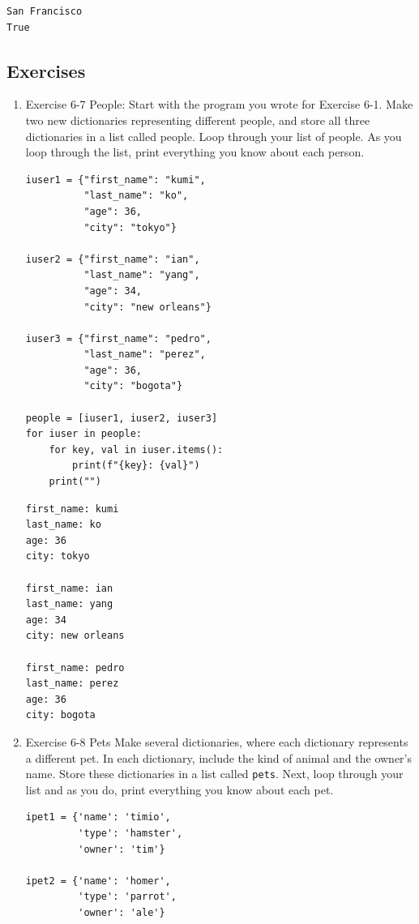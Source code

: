 \documentclass[10pt]{book}
\begin{document}
\label{org8144d53}
\begin{verbatim}
San Francisco
True
\end{verbatim}
\subsection{Exercises}
\label{sec:org0406610}
\begin{enumerate}
\item Exercise 6-7 People:
\label{sec:orgbe842dd}
Start with the program you wrote for Exercise 6-1. Make two new dictionaries representing different people, and store all three dictionaries in a list called people. Loop through your list of people. As you loop through the list, print everything you know about each person.
\begin{verbatim}
iuser1 = {"first_name": "kumi",
          "last_name": "ko",
          "age": 36,
          "city": "tokyo"}

iuser2 = {"first_name": "ian",
          "last_name": "yang",
          "age": 34,
          "city": "new orleans"}

iuser3 = {"first_name": "pedro",
          "last_name": "perez",
          "age": 36,
          "city": "bogota"}

people = [iuser1, iuser2, iuser3]
for iuser in people:
    for key, val in iuser.items():
        print(f"{key}: {val}")
    print("")
\end{verbatim}

\label{org0f644f3}
\begin{verbatim}
first_name: kumi
last_name: ko
age: 36
city: tokyo

first_name: ian
last_name: yang
age: 34
city: new orleans

first_name: pedro
last_name: perez
age: 36
city: bogota
\end{verbatim}
\item Exercise 6-8 Pets
\label{sec:org2e6f585}
Make several dictionaries, where each dictionary represents a different pet. In each dictionary, include the kind of animal and the owner’s name. Store these dictionaries in a list called \texttt{pets}. Next, loop through your list and as you do, print everything you know about each pet.
\begin{verbatim}
ipet1 = {'name': 'timio',
         'type': 'hamster',
         'owner': 'tim'}

ipet2 = {'name': 'homer',
         'type': 'parrot',
         'owner': 'ale'}


\end{verbatim}
\end{enumerate}
\end{document}
